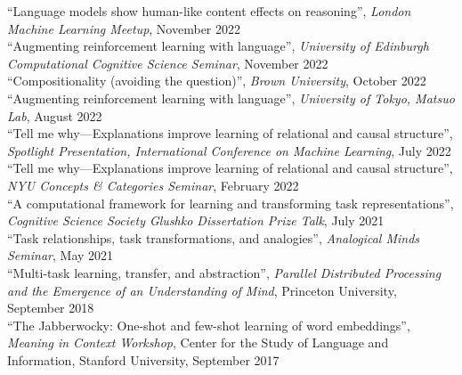 \documentclass[margin]{res}
\begin{document}
\begin{resume}
{``Language models show human-like content effects on reasoning'',} \textit{London Machine Learning Meetup}, November 2022\\[3pt] 
{``Augmenting reinforcement learning with language'',} \textit{University of Edinburgh Computational Cognitive Science Seminar}, November 2022\\[3pt] 
{``Compositionality (avoiding the question)'',} \textit{Brown University}, October 2022\\[3pt] 
{``Augmenting reinforcement learning with language'',} \textit{University of Tokyo, Matsuo Lab}, August 2022\\[3pt] 
{``Tell me why---Explanations improve learning of relational and causal structure'',} \textit{Spotlight Presentation, International Conference on Machine Learning}, July 2022\\[3pt] 
{``Tell me why---Explanations improve learning of relational and causal structure'',} \textit{NYU Concepts \& Categories Seminar}, February 2022\\[3pt] 
{``A computational framework for learning and transforming task representations'',} \textit{Cognitive Science Society Glushko Dissertation Prize Talk}, July 2021\\[3pt] 
{``Task relationships, task transformations, and analogies'',} \textit{Analogical Minds Seminar}, May 2021\\[3pt] 
{``Multi-task learning, transfer, and abstraction'',} \textit{Parallel Distributed Processing and the Emergence of an Understanding of Mind}, Princeton University, September 2018\\[3pt] 
{``The Jabberwocky: One-shot and few-shot learning of word embeddings'',} \textit{Meaning in Context Workshop}, Center for the Study of Language and Information,  Stanford University, September 2017 


\end{resume}
\end{document}
